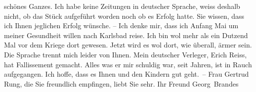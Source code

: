 \begin{ledgroupsized}[t]{13cm}
               schönes Ganzes.\pend
           \pstart
           {\pb}Ich habe keine Zeitungen in
               deutscher Sprache, weiss deshalb nicht, ob das Stück aufgeführt worden noch ob es Erfolg hatte. Sie
               wissen, dass ich Ihnen jeglichen Erfolg wünsche. – Ich denke mir, dass ich
                  Anfang Mai um meiner Gesundheit willen nach Karlsbad reise. Ich bin wol mehr als ein Dutzend Mal vor dem
               Kriege dort gewesen. Jetzt wird es wol dort, wie überall,  ärmer sein. Die Sprache trennt mich leider von Ihnen. Mein deutscher
               Verleger, Erich Reiss, hat Fallissement
               gemacht. Alles was er mir schuldig war, seit Jahren, ist in Rauch aufgegangen.\pend
           \pstart
           Ich hoffe, dass es Ihnen und den Kindern gut geht. – Frau Gertrud Rung, die Sie freundlich empfingen, liebt Sie sehr. Ihr Freund
                  \spacefill\mbox{Georg Brandes}\pend
           
         
         \endnumbering{}\end{ledgroupsized}  \newcommand{\dateiname}{L02470}\newcommand{\titel}{Georg Brandes an Arthur Schnitzler, 21. 4. 1926}\newcommand{\editorInnen}{Martin Anton Müller und Gerd-Hermann Susen}
      